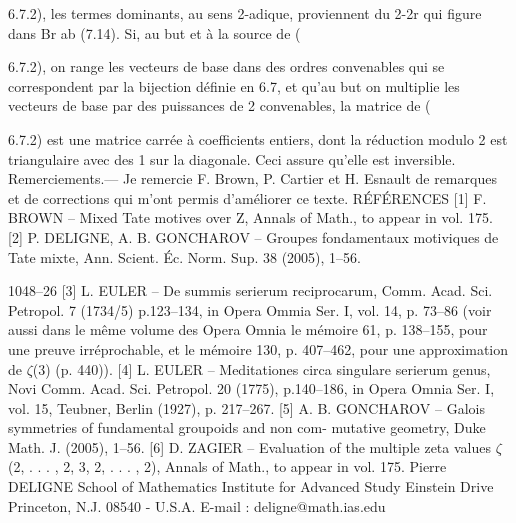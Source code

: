 \documentclass[11pt]{article}
\begin{document}
6.7.2), les termes dominants, au sens 2-adique, proviennent du 2-2r qui figure dans Br ab (7.14). Si, au but et à la source de (

6.7.2), on range les vecteurs de base dans des ordres convenables qui se correspondent par la bijection définie en 6.7, et qu’au but on multiplie les vecteurs de base par des puissances de 2 convenables, la matrice de (

6.7.2) est une matrice carrée à coefficients entiers, dont la réduction modulo 2 est triangulaire avec des 1 sur la diagonale. Ceci assure qu’elle est inversible. Remerciements.--- Je remercie F. Brown, P. Cartier et H. Esnault de remarques et de corrections qui m’ont permis d’améliorer ce texte. RÉFÉRENCES [1] F. BROWN -- Mixed Tate motives over Z, Annals of Math., to appear in vol. 175. [2] P. DELIGNE, A. B. GONCHAROV -- Groupes fondamentaux motiviques de Tate mixte, Ann. Scient. Éc. Norm. Sup. 38 (2005), 1--56.

1048--26 [3] L. EULER -- De summis serierum reciprocarum, Comm. Acad. Sci. Petropol. 7 (1734/5) p.123--134, in Opera Ommia Ser. I, vol. 14, p. 73--86 (voir aussi dans le même volume des Opera Omnia le mémoire 61, p. 138--155, pour une preuve irréprochable, et le mémoire 130, p. 407--462, pour une approximation de \(\zeta\)(3) (p. 440)). [4] L. EULER -- Meditationes circa singulare serierum genus, Novi Comm. Acad. Sci. Petropol. 20 (1775), p.140--186, in Opera Omnia Ser. I, vol. 15, Teubner, Berlin (1927), p. 217--267. [5] A. B. GONCHAROV -- Galois symmetries of fundamental groupoids and non com- mutative geometry, Duke Math. J. (2005), 1--56. [6] D. ZAGIER -- Evaluation of the multiple zeta values \(\zeta\)(2, . . . , 2, 3, 2, . . . , 2), Annals of Math., to appear in vol. 175. Pierre DELIGNE School of Mathematics Institute for Advanced Study Einstein Drive Princeton, N.J. 08540 - U.S.A. E-mail : deligne@math.ias.edu
\end{document}
